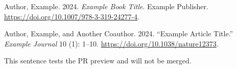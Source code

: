 \documentclass[
  letterpaper,
  DIV=11,
  numbers=noendperiod]{scrartcl}
\newlength{\cslhangindent}
\newenvironment{CSLReferences}[2] %
 {\begin{list}{}{%
  \setlength{\itemindent}{0pt}
  \setlength{\leftmargin}{0pt}
  \setlength{\parsep}{0pt}
  \ifodd #1
   \setlength{\leftmargin}{\cslhangindent}
   \setlength{\itemindent}{-1\cslhangindent}
  \fi
  \setlength{\itemsep}{#2\baselineskip}}}
 {\end{list}}
\begin{document}
\protect{}\label{refs}
\begin{CSLReferences}{1}{1}
Author, Example. 2024. \emph{Example Book Title}. Example Publisher.
\url{https://doi.org/10.1007/978-3-319-24277-4}.

Author, Example, and Another Coauthor. 2024. {``Example Article
Title.''} \emph{Example Journal} 10 (1): 1--10.
\url{https://doi.org/10.1038/nature12373}.

\end{CSLReferences}

This sentence tests the PR preview and will not be merged.
\end{document}

